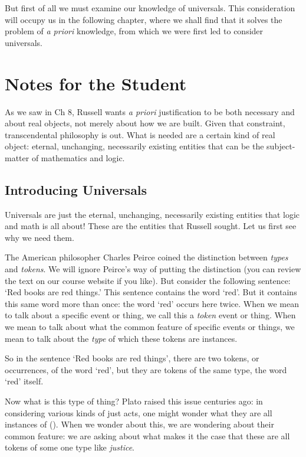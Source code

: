 \documentclass[oneside,letterpaper,12pt]{book}
\begin{document}
But first of all we must examine our knowledge of universals. This
consideration will occupy us in the following chapter, where we shall
find that it solves the problem of \emph{a priori} knowledge, from which
we were first led to consider universals.

\protect\hypertarget{link2HCH0010}{}{}

\pagebreak
\section{Notes for the Student}
As we saw in Ch  8, Russell wants \textit{a priori} justification to be both necessary and about real objects, not merely about how we are built. Given that constraint, transcendental philosophy is out. What is needed are a certain kind of real object: eternal, unchanging, necessarily existing entities that can be the subject-matter of mathematics and logic.
\subsection*{Introducing Universals}
Universals are just the eternal, unchanging, necessarily existing entities that logic and math is all about! These are the entities that Russell sought. Let us first see why we need them.

The American philosopher Charles Peirce coined the distinction between \textit{types} and \textit{tokens}. We will ignore Peirce's way of putting the distinction (you can review the text on our course website if you like). But consider the following sentence: `Red books are red things.' This sentence contains the word `red'. But it contains this same word more than once: the word `red' occurs here twice. When we mean to talk about a specific event or thing, we call this a \textit{token} event or thing. When we mean to talk about what the common feature of specific events or things, we mean to talk about the \textit{type} of which these tokens are instances. 

So in the sentence `Red books are red things', there are two tokens, or occurrences, of the word `red', but they are tokens of the same type, the word `red' itself.

Now what is this type of thing? Plato raised this issue centuries ago: in considering various kinds of just acts, one might wonder what they are all instances of (\pageref{tokens}). When we wonder about this, we are wondering about their common feature: we are asking about what makes it the case that these are all tokens of some one type like \textit{justice}.
\end{document}
